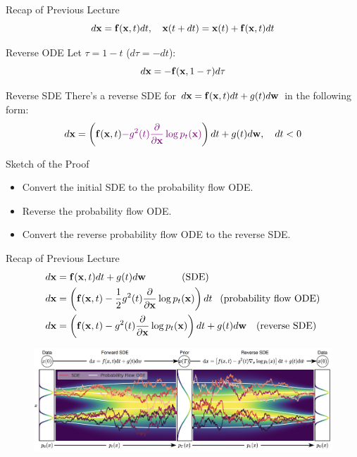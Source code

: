 \documentclass{beamer}
\begin{document}
\begin{frame}{Recap of Previous Lecture}
	\[
		d\mathbf{x} = \mathbf{f}(\mathbf{x}, t) dt, \quad \mathbf{x}(t + dt) = \mathbf{x}(t) + \mathbf{f}(\mathbf{x}, t) dt
	\]
	\vspace{-0.7cm}
	\begin{block}{Reverse ODE}
		Let $\tau = 1 - t$ ($d\tau = -dt$):
		\vspace{-0.3cm}
		\[
			d\mathbf{x} = - \mathbf{f}(\mathbf{x}, 1 - \tau) d \tau
		\]
	\end{block}
	\vspace{-0.5cm}
	\begin{block}{Reverse SDE}
		There's a reverse SDE for $d\mathbf{x} = \mathbf{f}(\mathbf{x}, t) dt + g(t) d\mathbf{w}$ in the following form:
		\vspace{-0.3cm}
		\[
			d\mathbf{x} = \left(\mathbf{f}(\mathbf{x}, t) {\color{violet}- g^2(t) \frac{\partial}{\partial \mathbf{x}}\log p_t(\mathbf{x})}\right) dt + g(t) d \mathbf{w}, \quad dt < 0
		\] 
	\end{block}
	\vspace{-0.5cm}
	\begin{block}{Sketch of the Proof}
		\begin{itemize}
			\item Convert the initial SDE to the probability flow ODE.
			\item Reverse the probability flow ODE.
			\item Convert the reverse probability flow ODE to the reverse SDE.
		\end{itemize}
	\end{block}
\end{frame}
\begin{frame}{Recap of Previous Lecture}
	\vspace{-0.5cm}
	\begin{align*}
		d\mathbf{x} &= \mathbf{f}(\mathbf{x}, t) dt + g(t) d \mathbf{w} \qquad\quad\;\:\, \text{(SDE)} \\
		d\mathbf{x} &= \left(\mathbf{f}(\mathbf{x}, t) -\frac{1}{2} g^2(t) \frac{\partial}{\partial \mathbf{x}} \log p_t(\mathbf{x}) \right) dt \;\,\,\, \text{(probability flow ODE)} \\
		d\mathbf{x} &= \left(\mathbf{f}(\mathbf{x}, t) - g^2(t) \frac{\partial }{\partial \mathbf{x}}\log p_t(\mathbf{x})\right) dt + g(t) d \mathbf{w} \quad \text{(reverse SDE)}
	\end{align*}
	\vspace{-0.5cm}
	\begin{figure}
		\includegraphics[width=\linewidth]{figs/sde}
	\end{figure}
\end{frame}
\end{document}
